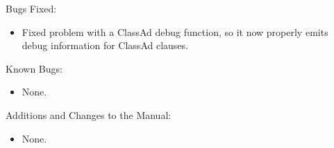 \noindent Bugs Fixed:

\begin{itemize}

\item Fixed problem with a ClassAd debug function,
so it now properly emits debug information for ClassAd 
clauses.

\end{itemize}

\noindent Known Bugs:

\begin{itemize}

\item None.

\end{itemize}

\noindent Additions and Changes to the Manual:

\begin{itemize}

\item None.

\end{itemize}
